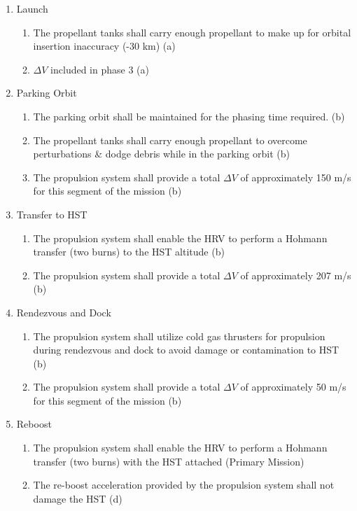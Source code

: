\documentclass[paper=letter, fontsize=11pt]{scrartcl} %
\numberwithin{equation}{section} %
\numberwithin{figure}{section} %
\numberwithin{table}{section} %
\begin{document}
\begin{enumerate}
    \item Launch
          \begin{enumerate}
            \item The propellant tanks shall carry enough propellant to make up for orbital insertion inaccuracy (-30 km) (a)
            \item $\Delta V$ included in phase 3 (a)
          \end{enumerate}
    \item Parking Orbit
          \begin{enumerate}
            \item The parking orbit shall be maintained for the phasing time required. (b)
            \item The propellant tanks shall carry enough propellant to overcome perturbations \& dodge debris while in the parking orbit (b)
            \item The propulsion system shall provide a total $\Delta V$ of approximately 150 m/s for this segment of the mission (b)
          \end{enumerate}
    \item Transfer to HST
          \begin{enumerate}
            \item The propulsion system shall enable the HRV to perform a Hohmann transfer (two burns) to the HST altitude (b)
            \item The propulsion system shall provide a total $\Delta V$ of approximately 207 m/s (b)
          \end{enumerate}
    \item Rendezvous and Dock
          \begin{enumerate}
            \item The propulsion system shall utilize cold gas thrusters for propulsion during rendezvous and dock to avoid damage or contamination to HST (b)
            \item The propulsion system shall provide a total $\Delta V$ of approximately 50 m/s for this segment of the mission (b)
          \end{enumerate}
    \item Reboost
          \begin{enumerate}
            \item The propulsion system shall enable the HRV to perform a Hohmann transfer (two burns) with the HST attached (Primary Mission)
            \item The re-boost acceleration provided by the propulsion system shall not damage the HST (d)

\end{enumerate}
\end{enumerate}
\end{document}
